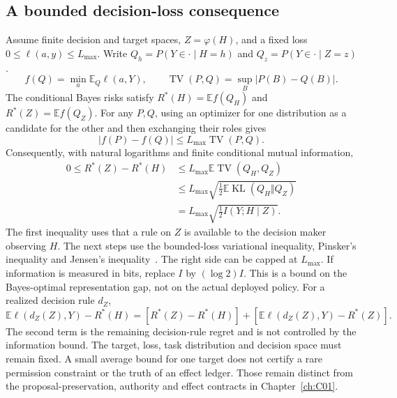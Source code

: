 \subsection{A bounded decision-loss consequence}\label{sec:C02:riskbound}
Assume finite decision and target spaces, $Z=\varphi(H)$, and a fixed loss $0\leq\ell(a,y)\leq L_{\max}$. Write $Q_h=P(Y\in\cdot\mid H=h)$ and $Q_z=P(Y\in\cdot\mid Z=z)$.
\begin{equation}
 f(Q)=\min_a\mathbb E_Q\ell(a,Y),\qquad
 \operatorname{TV}(P,Q)=\sup_B|P(B)-Q(B)|.
\end{equation}
The conditional Bayes risks satisfy $R^*(H)=\mathbb E f(Q_H)$ and $R^*(Z)=\mathbb E f(Q_Z)$. For any $P,Q$, using an optimizer for one distribution as a candidate for the other and then exchanging their roles gives
\begin{equation}
 |f(P)-f(Q)|\leq L_{\max}\operatorname{TV}(P,Q).
\end{equation}
Consequently, with natural logarithms and finite conditional mutual information,
\begin{equation}
\begin{aligned}
 0\leq R^*(Z)-R^*(H)
 &\leq L_{\max}\mathbb E\operatorname{TV}(Q_H,Q_Z)\\
 &\leq L_{\max}\sqrt{\tfrac12\mathbb E\operatorname{KL}(Q_H\Vert Q_Z)}\\
 &=L_{\max}\sqrt{\tfrac12 I(Y;H\mid Z)}.
\end{aligned}
\end{equation}
The first inequality uses that a rule on $Z$ is available to the decision maker observing $H$. The next steps use the bounded-loss variational inequality, Pinsker's inequality and Jensen's inequality~\cite{ch02_reid2011}. The right side can be capped at $L_{\max}$. If information is measured in bits, replace $I$ by $(\log 2)I$. This is a bound on the Bayes-optimal representation gap, not on the actual deployed policy. For a realized decision rule $d_Z$,
\begin{equation}
 \mathbb E\ell(d_Z(Z),Y)-R^*(H)
 =[R^*(Z)-R^*(H)]+[\mathbb E\ell(d_Z(Z),Y)-R^*(Z)].
\end{equation}
The second term is the remaining decision-rule regret and is not controlled by the information bound. The target, loss, task distribution and decision space must remain fixed. A small average bound for one target does not certify a rare permission constraint or the truth of an effect ledger. Those remain distinct from the proposal-preservation, authority and effect contracts in Chapter~\ref{ch:C01}.


